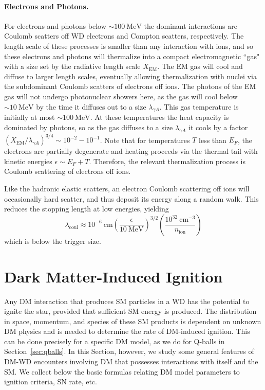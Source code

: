 \documentclass[preprintnumbers,amsmath,amssymb,prd,superscriptaddress]{revtex4}
\newcommand{\MeV}{\text{MeV}}
\newcommand{\cm}{\text{cm}}
\def\r{\right)}
\def\l{\left(}
\begin{document}
\paragraph{Electrons and Photons.}
For electrons and photons below $\sim 100 ~\MeV$ the dominant interactions are Coulomb scatters off WD electrons and Compton scatters, respectively.
The length scale of these processes is smaller than any interaction with ions, and so these electrons and photons will thermalize into a compact electromagnetic ``gas" with a size set by the radiative length scale $X_\text{EM}$.
The EM gas will cool and diffuse to larger length scales, eventually allowing thermalization with nuclei via the subdominant Coulomb scatters of electrons off ions.
The photons of the EM gas will not undergo photonuclear showers here, as the gas will cool below $\sim 10~\MeV$ by the time it diffuses out to a size $\lambda_{\gamma A}$.
This gas temperature is initially at most $\sim 100~\MeV$.
At these temperatures the heat capacity is dominated by photons, so as the gas diffuses to a size $\lambda_{\gamma A}$ it cools by a factor $(X_\text{EM}/\lambda_{\gamma A})^{3/4} \sim 10^{-2} - 10^{-1}$.
Note that for temperatures $T$ less than $E_F$, the electrons are partially degenerate and heating proceeds via the thermal tail with kinetic energies $\epsilon \sim E_F + T$.
Therefore, the relevant thermalization process is Coulomb scattering of electrons off ions.

Like the hadronic elastic scatters, an electron Coulomb scattering off ions will occasionally hard scatter, and thus deposit its energy along a random walk. This reduces the stopping length at low energies, yielding
\begin{equation}
\lambda_\text{coul} \approx 10^{-6}~\cm \l \frac{\epsilon}{10 ~\MeV} \r^{3/2} \l \frac{10^{32} ~\cm^{-3}}{n_\text{ion}}\r
\end{equation}
which is below the trigger size.

\section{Dark Matter-Induced Ignition}
\label{sec:dmignition}
Any DM interaction that produces SM particles in a WD has the potential to ignite the star, provided that sufficient SM energy is produced.
The distribution in space, momentum, and species of these SM products is dependent on unknown DM physics and is needed to determine the rate of DM-induced ignition.
This can be done precisely for a specific DM model, as we do for Q-balls in Section~\ref{sec:qballs}.
In this Section, however, we study some general features of DM-WD encounters involving DM that possesses interactions with itself and the SM.
We collect below the basic formulas relating DM model parameters to ignition criteria, SN rate, etc.
\end{document}
